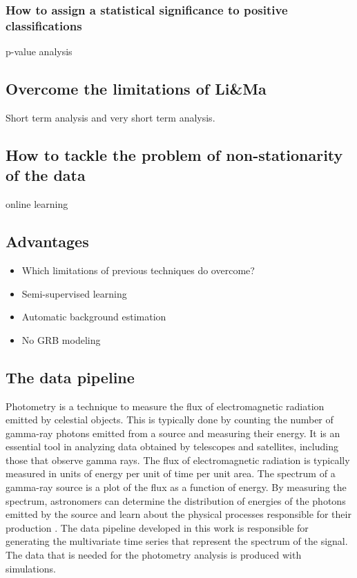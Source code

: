 \subsubsection{How to assign a statistical significance to positive classifications}
p-value analysis
\subsection{Overcome the limitations of Li\&Ma}
Short term analysis and very short term analysis.
\subsection{How to tackle the problem of non-stationarity of the data}
online learning

\subsection{Advantages}
\begin{itemize}
    \item Which limitations of previous techniques do overcome?
    \item Semi-supervised learning
    \item Automatic background estimation
    \item No GRB modeling
\end{itemize}






\subsection{The data pipeline}
\label{s:Contribution-1-data-pipeline}
Photometry is a technique to measure the flux of electromagnetic radiation emitted by celestial objects. This is typically done by counting the number of gamma-ray photons emitted from a source and measuring their energy. It is an essential tool in analyzing data obtained by telescopes and satellites, including those that observe gamma rays. The flux of electromagnetic radiation is typically measured in units of energy per unit of time per unit area. The spectrum of a gamma-ray source is a plot of the flux as a function of energy. By measuring the spectrum, astronomers can determine the distribution of energies of the photons emitted by the source and learn about the physical processes responsible for their production \cite{giommi2012software}. The data pipeline developed in this work is responsible for generating the multivariate time series that represent the spectrum of the signal. The data that is needed for the photometry analysis is produced with simulations.  

